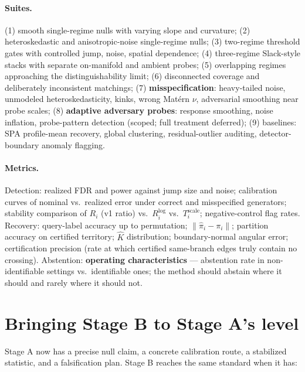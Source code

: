 \documentclass[11pt]{article}
\begin{document}
\paragraph{Suites.}
(1) smooth single-regime nulls with varying slope and curvature;
(2) heteroskedastic and anisotropic-noise single-regime nulls;
(3) two-regime threshold gates with controlled jump, noise, spatial dependence;
(4) three-regime Slack-style stacks with separate on-manifold and ambient probes;
(5) overlapping regimes approaching the distinguishability limit;
(6) disconnected coverage and deliberately inconsistent matchings;
(7) \textbf{misspecification}: heavy-tailed noise, unmodeled heteroskedasticity, kinks,
wrong Mat\'ern \(\nu\), adversarial smoothing near probe scales;
(8) \textbf{adaptive adversary probes}: response smoothing, noise inflation, probe-pattern
detection (scoped; full treatment deferred);
(9) baselines: SPA profile-mean recovery, global clustering, residual-outlier auditing,
detector-boundary anomaly flagging.

\paragraph{Metrics.}
Detection: realized FDR and power against jump size and noise; calibration curves of nominal
vs.\ realized error under correct and misspecified generators; stability comparison of
\(R_i\) (v1 ratio) vs.\ \(R_i^{\log}\) vs.\ \(T_i^{\mathrm{scale}}\); negative-control flag
rates. Recovery: query-label accuracy up to permutation; \(\|\widehat\pi_i-\pi_i\|\);
partition accuracy on certified territory; \(\widehat K\) distribution; boundary-normal
angular error; certification precision (rate at which certified same-branch edges truly
contain no crossing). Abstention: \textbf{operating characteristics} --- abstention rate in
non-identifiable settings vs.\ identifiable ones; the method should abstain where it should
and rarely where it should not.

\section{Bringing Stage B to Stage A's level}
\label{sec:parity}

Stage A now has a precise null claim, a concrete calibration route, a stabilized statistic,
and a falsification plan. Stage B reaches the same standard when it has:
\end{document}

